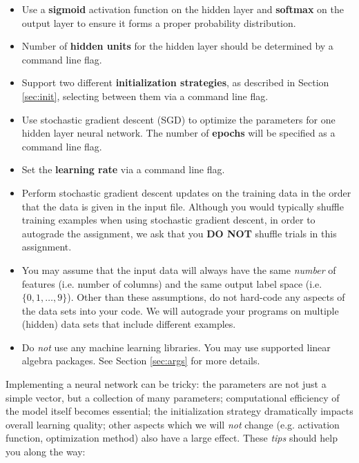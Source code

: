 \documentclass[11pt]{article}
\numberwithin{equation}{section} %
\numberwithin{figure}{section} %
\numberwithin{table}{section} %
\begin{document}
\begin{itemize}
    \item Use a {\bf sigmoid} activation function on the hidden layer and {\bf softmax} on the  output layer to ensure it forms a proper probability distribution.
    \item Number of {\bf hidden units} for the hidden layer should be determined by a command line flag.
    \item Support two different {\bf initialization strategies}, as described in Section \ref{sec:init}, selecting between them via a command line flag.
    \item Use stochastic gradient descent (SGD) to optimize the parameters for one hidden layer neural network. The number of {\bf epochs} will be specified as a command line flag. 
    \item Set the {\bf learning rate} via a command line flag.
    \item Perform stochastic gradient descent updates on the training data in the order that the data is given in the input file. Although you would typically shuffle training examples when using stochastic gradient descent, in order to autograde the assignment, we ask that you {\bf DO NOT} shuffle trials in this assignment.
    \item You may assume that the input data will always have the same \emph{number} of features (i.e. number of columns) and the same output label space (i.e. $\{0,1,\ldots,9\}$). Other than these assumptions, do not hard-code any aspects of the data sets into your code. We will autograde your programs on multiple (hidden) data sets that include different examples.
    \item Do \emph{not} use any machine learning libraries. You may use supported linear algebra packages. See Section \ref{sec:args} for more details.
\end{itemize}

Implementing a neural network can be tricky: the parameters are not just a simple vector, but a collection of many parameters; computational efficiency of the model itself becomes essential; the initialization strategy dramatically impacts overall learning quality;  other aspects which we will \emph{not} change (e.g. activation function, optimization method) also have a large effect. These \emph{tips} should help you along the way:
\end{document}
